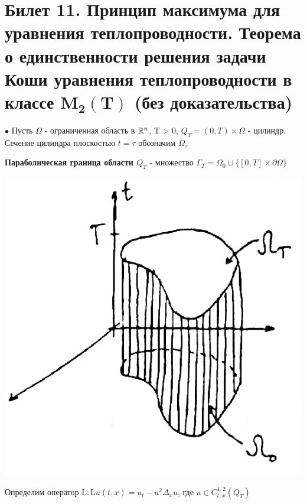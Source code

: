 

\section{Билет 11. Принцип максимума для уравнения теплопроводности. Теорема о единственности решения задачи Коши уравнения теплопроводности в классе $\mathbf{M_2(T)}$ (без доказательства) }
$\bullet$ Пусть $\Omega$ - ограниченная область в $\mathbb{R}^n$, T > 0, 
$Q_T = (0,T) \times \Omega$ - цилиндр. Сечение цилиндра плоскостью $t = \tau$ обозначим $\Omega_\tau$

\begin{definition}
{\bf Параболическая граница области $Q_T$} - множество $\Gamma_T = \Omega_0 \cup \{[0,T] \times \partial{\Omega} \}$
\end{definition}
\begin{center}
\includegraphics[scale=0.5]{11_1_new}
\end{center}

Определим оператор $\mathrm{L} : \mathrm{L}u(t,x) = u_t - a^2 \Delta_xu$, где 
$u \in C_{t, x}^{1,2}(Q_T)$

